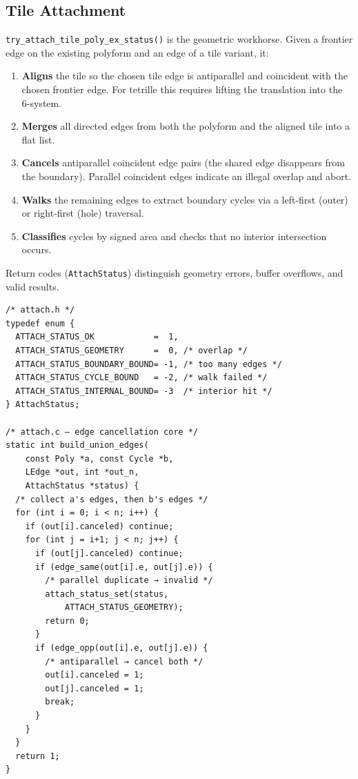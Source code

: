 \documentclass[10pt,a4paper]{article}
\let\polysubsection\subsection
\renewcommand\subsection{\needspace{0.12\textheight}\polysubsection}
\newcommand{\code}[1]{\texttt{\small #1}}
\newcommand{\file}[1]{\texttt{\footnotesize #1}}
\begin{document}
\subsection{Tile Attachment}

\begin{tcolorbox}[dualbox, title=Attachment Algorithm — \file{src/core/attach.c}]
  \code{try\_attach\_tile\_poly\_ex\_status()} is the geometric
  workhorse.  Given a frontier edge on the existing polyform and an
  edge of a tile variant, it:

  \begin{enumerate}
    \item \textbf{Aligns} the tile so the chosen tile edge is
      antiparallel and coincident with the chosen frontier edge.  For
      tetrille this requires lifting the translation into the 6-system.
    \item \textbf{Merges} all directed edges from both the polyform and
      the aligned tile into a flat list.
    \item \textbf{Cancels} antiparallel coincident edge pairs
      (the shared edge disappears from the boundary).  Parallel
      coincident edges indicate an illegal overlap and abort.
    \item \textbf{Walks} the remaining edges to extract boundary cycles
      via a left-first (outer) or right-first (hole) traversal.
    \item \textbf{Classifies} cycles by signed area and checks that no
      interior intersection occurs.
  \end{enumerate}

  Return codes (\code{AttachStatus}) distinguish geometry errors,
  buffer overflows, and valid results.
\tcblower
\begin{verbatim}
/* attach.h */
typedef enum {
  ATTACH_STATUS_OK            =  1,
  ATTACH_STATUS_GEOMETRY      =  0, /* overlap */
  ATTACH_STATUS_BOUNDARY_BOUND= -1, /* too many edges */
  ATTACH_STATUS_CYCLE_BOUND   = -2, /* walk failed */
  ATTACH_STATUS_INTERNAL_BOUND= -3  /* interior hit */
} AttachStatus;

/* attach.c — edge cancellation core */
static int build_union_edges(
    const Poly *a, const Cycle *b,
    LEdge *out, int *out_n,
    AttachStatus *status) {
  /* collect a's edges, then b's edges */
  for (int i = 0; i < n; i++) {
    if (out[i].canceled) continue;
    for (int j = i+1; j < n; j++) {
      if (out[j].canceled) continue;
      if (edge_same(out[i].e, out[j].e)) {
        /* parallel duplicate → invalid */
        attach_status_set(status,
            ATTACH_STATUS_GEOMETRY);
        return 0;
      }
      if (edge_opp(out[i].e, out[j].e)) {
        /* antiparallel → cancel both */
        out[i].canceled = 1;
        out[j].canceled = 1;
        break;
      }
    }
  }
  return 1;
}
\end{verbatim}
\end{tcolorbox}
\end{document}
